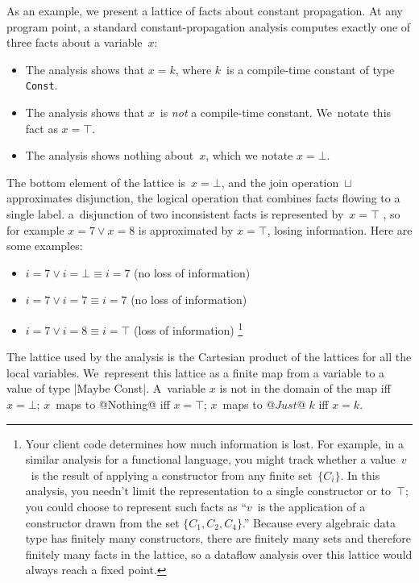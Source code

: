 \documentclass[blockstyle,preprint,natbib,nocopyrightspace]{sigplanconf}
\newcommand\join{\sqcup}
\begin{document}
As an example, 
we present a lattice of facts about constant propagation.
At any program point, a standard constant-propagation analysis
computes exactly one of three
facts about a variable~$x$:
\begin{itemize}
\item
The analysis shows that
$x = k$, where $k$~is a compile-time constant of type \texttt{Const}.
\item
The analysis shows that $x$~is \emph{not} a compile-time constant.
We~notate this fact as $x = \top$.
\item
The analysis shows nothing about~$x$, which we notate $x=\bot$.
\end{itemize}
The bottom element of the lattice is~$x=\bot$, and
the join operation~$\join$ approximates disjunction,
the logical operation that combines facts flowing to a single label.
a~disjunction of two inconsistent facts is represented by~$x=\top$%
\ifcutting,
so for example 
$x = 7 \lor x = 8$ is approximated by $x = \top$, 
losing information.%
\else
Here are some examples:
\begin{itemize}
\item
$i = 7 \lor i=\bot \equiv i=7$ (no loss of information)
\item
$i = 7 \lor i= 7 \equiv  i=7$ (no loss of information)
\item
$i = 7 \lor i = 8 \equiv i = \top$ (loss of information)%
\fi
\footnote
{Your client code determines how much information is lost.
For example, in a similar analysis for a functional language,
you might track whether a value\ifcutting\else~$v$\fi\ is 
the result of applying a constructor from any finite set~$\{C_i\}$.
\ifcutting
\else
In this analysis, you needn't limit the representation to a
single constructor or to~$\top$;
you could choose to represent such facts as ``$v$~is
the application of a constructor drawn from the set $\{C_1, C_2,
C_4\}$.''
Because every algebraic data type has finitely many constructors,
there are finitely many sets and therefore finitely many facts in the
lattice, so a dataflow analysis over this lattice would always reach a
fixed point.
\fi
}
\ifcutting\else
\end{itemize}
\fi

The lattice used by the analysis is the Cartesian product of the
lattices for all the local variables.
We~represent this lattice as a finite map from a variable
to a value of type \icode|Maybe Const|.
A~variable $x$ is not in the domain of the map iff $x=\bot$;
$x$~maps to @Nothing@ iff $x=\top$; $x$~maps to $@Just@\;k$ iff
$x=k$.
\end{document}
